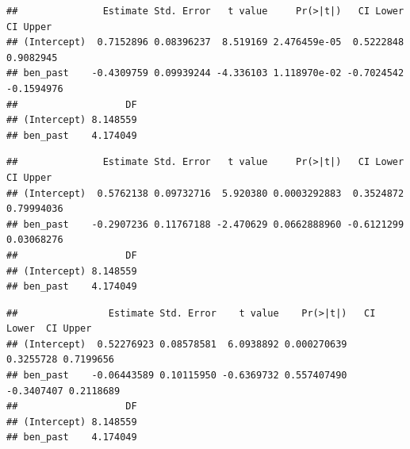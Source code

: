 \documentclass[
]{article}
\newenvironment{Shaded}{\begin{snugshade}}{\end{snugshade}}
\newcommand{\AttributeTok}[1]{\textcolor[rgb]{0.77,0.63,0.00}{#1}}
\newcommand{\DecValTok}[1]{\textcolor[rgb]{0.00,0.00,0.81}{#1}}
\newcommand{\FunctionTok}[1]{\textcolor[rgb]{0.00,0.00,0.00}{#1}}
\newcommand{\NormalTok}[1]{#1}
\newcommand{\SpecialCharTok}[1]{\textcolor[rgb]{0.00,0.00,0.00}{#1}}
\begin{document}
\begin{verbatim}
##               Estimate Std. Error   t value     Pr(>|t|)   CI Lower   CI Upper
## (Intercept)  0.7152896 0.08396237  8.519169 2.476459e-05  0.5222848  0.9082945
## ben_past    -0.4309759 0.09939244 -4.336103 1.118970e-02 -0.7024542 -0.1594976
##                   DF
## (Intercept) 8.148559
## ben_past    4.174049
\end{verbatim}

\begin{Shaded}
\end{Shaded}

\begin{verbatim}
##               Estimate Std. Error   t value     Pr(>|t|)   CI Lower   CI Upper
## (Intercept)  0.5762138 0.09732716  5.920380 0.0003292883  0.3524872 0.79994036
## ben_past    -0.2907236 0.11767188 -2.470629 0.0662888960 -0.6121299 0.03068276
##                   DF
## (Intercept) 8.148559
## ben_past    4.174049
\end{verbatim}

\begin{Shaded}
\end{Shaded}

\begin{verbatim}
##                Estimate Std. Error    t value    Pr(>|t|)   CI Lower  CI Upper
## (Intercept)  0.52276923 0.08578581  6.0938892 0.000270639  0.3255728 0.7199656
## ben_past    -0.06443589 0.10115950 -0.6369732 0.557407490 -0.3407407 0.2118689
##                   DF
## (Intercept) 8.148559
## ben_past    4.174049
\end{verbatim}
\end{document}
